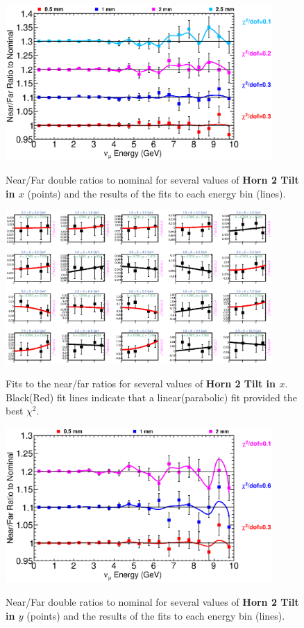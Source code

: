 \begin{figure}[ht]
  \begin{center}
    {\includegraphics[width=4.0in]{figures/Horn2XTilt_nof_summary.eps}}
  \end{center}
\caption{ Near/Far double ratios to nominal for several values of {\bf Horn 2 Tilt in $x$} (points) and the results of the fits to each energy bin (lines).}
\end{figure}

\begin{figure}[hb]
  \begin{center}
    {\includegraphics[width=4.0in]{figures/Horn2XTilt_nof_fits.eps}}
  \end{center}
\caption{ Fits to the near/far ratios for several values of {\bf Horn 2 Tilt in $x$}. Black(Red) fit lines indicate that a linear(parabolic) fit provided the best $\chi^2$. }
\end{figure}

\begin{figure}[ht]
  \begin{center}
    {\includegraphics[width=4.0in]{figures/Horn2YTilt_nof_summary.eps}}
  \end{center}
\caption{ Near/Far double ratios to nominal for several values of {\bf Horn 2 Tilt in $y$} (points) and the results of the fits to each energy bin (lines).}
\end{figure}

